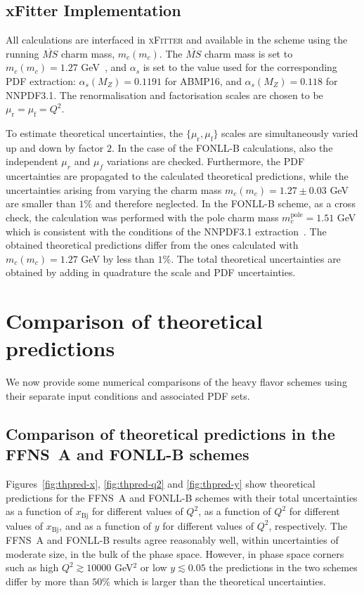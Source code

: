 \documentclass[pdftex,twocolumn,epjc3]{svjour3}          %
\newcommand{\abmp} {ABMP16\xspace}
\newcommand{\nnpdf} {NNPDF3.1\xspace}
\newcommand{\xfitter} {\textsc{xFitter}\xspace}
\newcommand{\xbj}{\ensuremath{x_{\text{Bj}}}\xspace}
\newcommand{\fonll} {{FONLL-B}\xspace}
\newcommand{\ffns} {{FFNS~A}\xspace}
\begin{document}
\subsection{xFitter Implementation}

All calculations are interfaced in \xfitter and available in the
scheme using the running $\overline{MS}$ charm mass, $m_c(m_c)$.  The
$\overline{MS}$ charm mass is set to $m_c(m_c) = 1.27$ GeV~\cite{Tanabashi:2018oca},
and $\alpha_s$ is set to the value used for the corresponding PDF
extraction: $\alpha_s(M_Z) = 0.1191$ for \abmp, and $\alpha_s(M_Z) =
0.118$ for \nnpdf.  The renormalisation and factorisation scales are
chosen to be $\mu_\mathrm{r} = \mu_\mathrm{f} = Q^2$.

To estimate theoretical uncertainties, the   $\{\mu_\mathrm{r} , \mu_\mathrm{f}\}$ scales are
simultaneously varied up and down by factor $2$. In the case of the
\fonll calculations, also the independent $\mu_r$ and $\mu_f$
variations are checked. Furthermore, the PDF uncertainties are
propagated to the calculated theoretical predictions, while the
uncertainties arising from varying the charm mass $m_c(m_c) = 1.27 \pm
0.03$ GeV are smaller than $1\%$ and therefore neglected. In the
\fonll scheme, as a cross check, the calculation was performed with
the pole charm mass $m_c^{\text{pole}} = 1.51$ GeV which is consistent
with the conditions of the \nnpdf extraction~\cite{Ball:2017nwa}. The
obtained theoretical predictions differ from the ones calculated with
$m_c(m_c) = 1.27$ GeV by less than $1\%$.  The total theoretical
uncertainties are obtained by adding in quadrature the scale and PDF
uncertainties.


\section{Comparison of theoretical predictions}
\label{sec:thpred-comparison}

We now provide some numerical  comparisons of the
heavy flavor schemes using their separate input conditions
and associated PDF sets. 


\subsection{Comparison of theoretical predictions in the \ffns and \fonll schemes}
\label{sec:compareI}


Figures~\ref{fig:thpred-x}, \ref{fig:thpred-q2} and \ref{fig:thpred-y}
show theoretical predictions
 for the \ffns and \fonll schemes 
 with their total uncertainties 
 as a function of \xbj for different values of $Q^2$,
 as a function of $Q^2$ for different values of \xbj,
 and as a function of $y$ for different values of $Q^2$, respectively.
%
The \ffns and \fonll results 
agree reasonably well, within uncertainties of moderate size, in the
bulk of the phase space. However, in phase space corners such as high
$Q^2 \gtrsim 10000$ GeV$^2$ or low $y \lesssim 0.05$ the predictions
in the two schemes differ by more than $50\%$ which is larger than the 
theoretical uncertainties.
\end{document}
